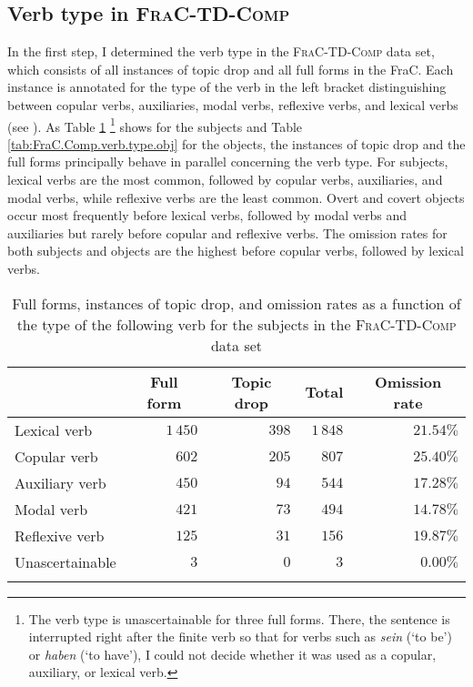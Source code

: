 \subsection{Verb type in \textsc{FraC-TD-Comp}}
In the first step, I determined the verb type in the \textsc{FraC-TD-Comp} data set, which consists of all instances of topic drop and all full forms in the FraC.
Each instance is annotated for the type of the verb in the left bracket distinguishing between copular verbs, auxiliaries, modal verbs, reflexive verbs,  and lexical verbs  (see ).
As Table \ref{tab:FraC.Comp.verb.type.subj}%
\footnote{The verb type is unascertainable for three full forms.
There, the sentence is interrupted right after the finite verb so that for verbs such as \textit{sein} (`to be') or \textit{haben} (`to have'), I could not decide whether it was used as a copular, auxiliary, or lexical verb.}
%
shows for the subjects and Table \ref{tab:FraC.Comp.verb.type.obj} for the objects, the instances of topic drop and the full forms principally behave in parallel concerning the verb type.
For subjects, lexical verbs are the most common, followed by copular verbs, auxiliaries, and modal verbs, while reflexive verbs  are the least common.
Overt and covert objects occur most frequently before lexical verbs, followed by modal verbs and auxiliaries but rarely before copular and reflexive verbs. 
The omission rates for both subjects and objects are the highest before copular verbs, followed by lexical verbs.

\begin{table}
\caption{Full forms, instances of topic drop, and omission rates as a function of the type of the following verb for the subjects in the \textsc{FraC-TD-Comp} data set}
\centering
\begin{tabular}{lrrrr}
\lsptoprule
\multicolumn{1}{c}{Verb type} & \multicolumn{1}{c}{Full form} & \multicolumn{1}{c}{Topic drop} & \multicolumn{1}{c}{Total} & \multicolumn{1}{c}{Omission rate}\\
\midrule
Lexical verb& $1\,450$ & $398$ & $1\,848$ & $21.54\%$ \\
Copular  verb& $602$ & $205$ & $807$ & $25.40\%$\\
Auxiliary  verb& $450$ & $94$ & $544$ & $17.28\%$ \\
Modal verb& $421$ & $73$ & $494$ & $14.78\%$ \\
Reflexive verb& $125$ & $31$ & $156$ & $19.87\%$ \\
Unascertainable & $3$ & $0$ & $3$ & $0.00\%$\\
\lspbottomrule
\end{tabular}
\label{tab:FraC.Comp.verb.type.subj}
\end{table}

